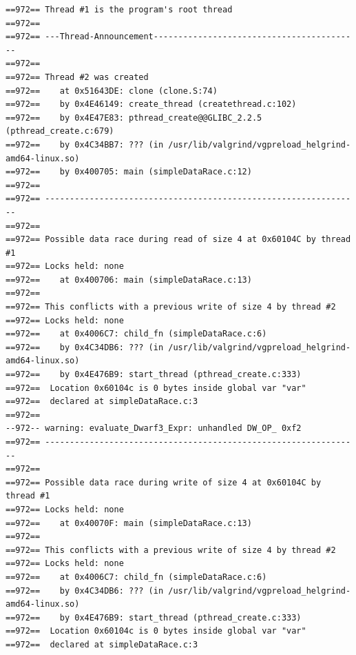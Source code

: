 \begin{verbatim}
==972== Thread #1 is the program's root thread
==972==
==972== ---Thread-Announcement------------------------------------------
==972==
==972== Thread #2 was created
==972==    at 0x51643DE: clone (clone.S:74)
==972==    by 0x4E46149: create_thread (createthread.c:102)
==972==    by 0x4E47E83: pthread_create@@GLIBC_2.2.5 (pthread_create.c:679)
==972==    by 0x4C34BB7: ??? (in /usr/lib/valgrind/vgpreload_helgrind-amd64-linux.so)
==972==    by 0x400705: main (simpleDataRace.c:12)
==972==
==972== ----------------------------------------------------------------
==972==
==972== Possible data race during read of size 4 at 0x60104C by thread #1
==972== Locks held: none
==972==    at 0x400706: main (simpleDataRace.c:13)
==972==
==972== This conflicts with a previous write of size 4 by thread #2
==972== Locks held: none
==972==    at 0x4006C7: child_fn (simpleDataRace.c:6)
==972==    by 0x4C34DB6: ??? (in /usr/lib/valgrind/vgpreload_helgrind-amd64-linux.so)
==972==    by 0x4E476B9: start_thread (pthread_create.c:333)
==972==  Location 0x60104c is 0 bytes inside global var "var"
==972==  declared at simpleDataRace.c:3
==972==
--972-- warning: evaluate_Dwarf3_Expr: unhandled DW_OP_ 0xf2
==972== ----------------------------------------------------------------
==972==
==972== Possible data race during write of size 4 at 0x60104C by thread #1
==972== Locks held: none
==972==    at 0x40070F: main (simpleDataRace.c:13)
==972==
==972== This conflicts with a previous write of size 4 by thread #2
==972== Locks held: none
==972==    at 0x4006C7: child_fn (simpleDataRace.c:6)
==972==    by 0x4C34DB6: ??? (in /usr/lib/valgrind/vgpreload_helgrind-amd64-linux.so)
==972==    by 0x4E476B9: start_thread (pthread_create.c:333)
==972==  Location 0x60104c is 0 bytes inside global var "var"
==972==  declared at simpleDataRace.c:3
\end{verbatim}

